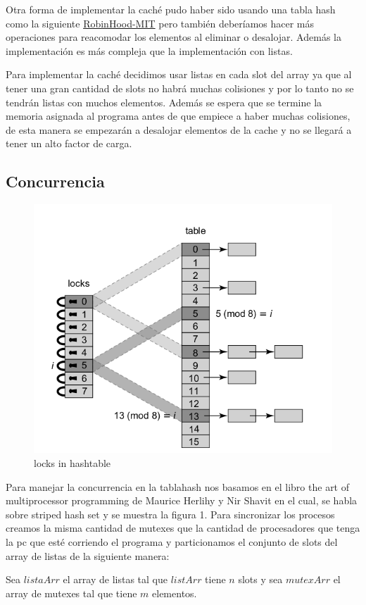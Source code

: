 \documentclass{article}
\begin{document}
Otra forma de implementar la caché pudo haber sido usando
una tabla hash como la siguiente 
\href{https://dspace.mit.edu/handle/1721.1/130693}{RobinHood-MIT}
pero también deberíamos hacer más operaciones para reacomodar los
elementos al eliminar o desalojar. Además la implementación
es más compleja que la implementación con listas.

Para implementar la caché decidimos usar listas en cada
slot del array ya que al tener una gran cantidad de
slots no habrá muchas colisiones y por lo tanto no
se tendrán listas con muchos elementos. Además se
espera que se termine la memoria asignada al programa
antes de que empiece a haber muchas
colisiones, de esta manera se empezarán a desalojar
elementos de la cache y no se llegará a tener un alto
factor de carga.

\subsection{Concurrencia}
\begin{figure}[ht]    
    \centering
    \includegraphics[width=0.7\linewidth]{concurrenciaHT.png}
    \caption{locks in hashtable}
    \label{}
\end{figure}

Para manejar la concurrencia en la tablahash nos basamos en el libro
the art of multiprocessor programming de Maurice Herlihy y Nir Shavit
en el cual, se habla sobre striped hash set y se muestra la figura 1.
Para sincronizar los procesos creamos la misma cantidad de mutexes
que la cantidad de procesadores que tenga la pc que esté corriendo
el programa y particionamos el conjunto de slots del array de listas
de la siguiente manera:

Sea $listaArr$ el array de listas tal que $listArr$ tiene $n$ slots y sea $mutexArr$ el array de mutexes tal que tiene
$m$ elementos.
\end{document}
